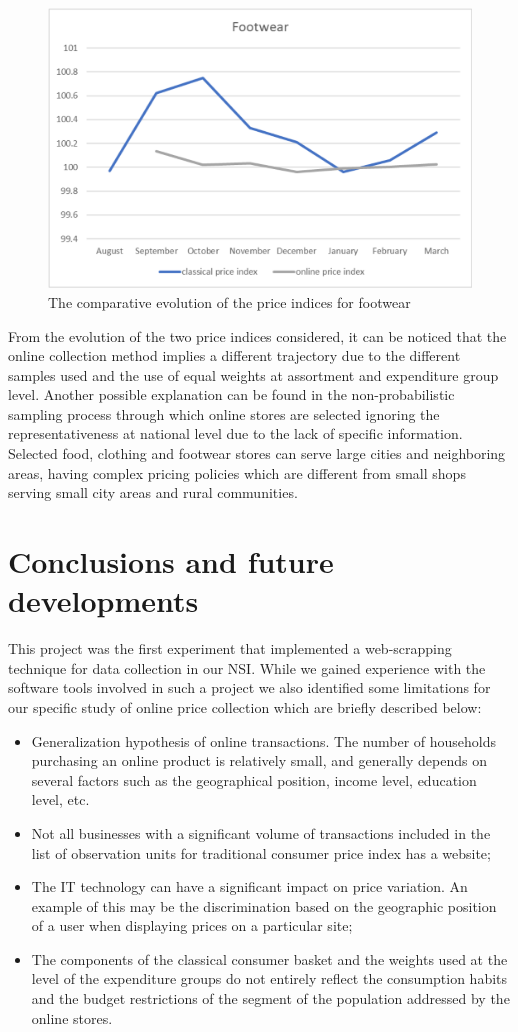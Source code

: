 \documentclass[]{article}
\begin{document}
\begin{figure}
\centering
\includegraphics[width=0.7\linewidth]{fig5.eps}
\caption{The comparative evolution of the price indices for footwear}
\label{fig:5}
\end{figure}


From the evolution of the two price indices considered, it can be noticed that the online 
collection method implies a different trajectory due to the different samples used and the use 
of equal weights at assortment and expenditure group level. Another possible explanation can be found 
in the non-probabilistic sampling process through which online stores are selected ignoring the 
representativeness at national level due to the lack of specific information. Selected food, 
clothing and footwear stores can serve large cities and neighboring areas, having complex pricing 
policies which are different from small shops serving small city areas and rural communities.


\section{Conclusions and future developments}\label{conclusions}

This project was the first experiment that implemented a web-scrapping technique for data collection 
in our NSI. While we gained experience with the software tools involved in such a project we also 
identified some limitations for our specific study of online price collection which are briefly described below:
\begin{itemize}
\item Generalization hypothesis of online transactions. The number of households purchasing an 
online product is relatively small, and generally depends on several factors such as the geographical position, 
income level, education level, etc.
\item Not all businesses with a significant volume of transactions included in the list of observation 
units for traditional consumer price index has a website;
\item The IT technology can have a significant impact on price variation. An example of this may be the discrimination 
based on the geographic position of a user when displaying prices on a particular site;
\item The components of the classical consumer basket and the weights used at the level of the expenditure groups do not entirely reflect the consumption habits and the budget restrictions of the segment of the population addressed by the online stores.
\end{itemize}
\end{document}
